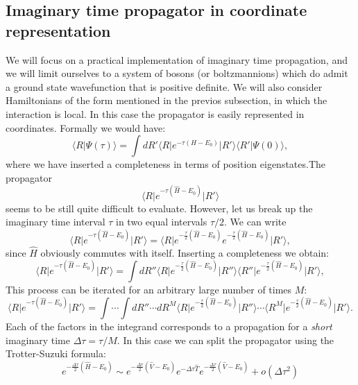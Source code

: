 \subsection{Imaginary time propagator in coordinate representation}
We will focus on a practical implementation of imaginary time propagation, and we will limit ourselves to a system of bosons (or boltzmannions) which do admit a ground state wavefunction that is positive definite. We will also consider Hamiltonians of the form mentioned in the previos subsection, in which the interaction is local.
In this case the propagator is easily represented in coordinates. Formally we would have:
\begin{equation}
\langle R \vert\Psi(\tau)\rangle=\int dR' \langle R\vert e^{-\tau(H-E_0)}\vert R'\rangle\langle R'\vert\Psi(0)\rangle,\label{general_diff}
\end{equation}
where we have inserted a completeness in terms of position eigenstates.The propagator
\begin{equation}
\langle R \vert e^{-\tau(\hat{H}-E_0)}\vert R'\rangle
\end{equation}
seems to be still quite difficult to evaluate. However, let us break up the imaginary time interval
$\tau$ in two equal intervals $\tau/2$. We can write
\begin{equation}
\langle R \vert e^{-\tau(\hat{H}-E_0)}\vert R'\rangle=\langle R \vert e^{-\frac{\tau}{2}(\hat{H}-E_0)}e^{-\frac{\tau}{2}(\hat{H}-E_0)}\vert R'\rangle,
\end{equation}
since $\hat{H}$ obviously commutes with itself. Inserting a completeness we obtain:
 \begin{equation}
\langle R \vert e^{-\tau(\hat{H}-E_0)}\vert R'\rangle=\int dR''\langle R \vert e^{-\frac{\tau}{2}(\hat{H}-E_0)}\vert R''\rangle\langle R''\vert e^{-\frac{\tau}{2}(\hat{H}-E_0)}\vert R'\rangle,
\end{equation}
This process can be iterated for an arbitrary large number of times $M$:
\begin{equation}
\langle R \vert e^{-\tau(\hat{H}-E_0)}\vert R'\rangle=\int\cdots\int dR''\cdots dR^M\langle R \vert e^{-\frac{\tau}{2}(\hat{H}-E_0)}\vert R''\rangle\cdots\langle R^M\vert e^{-\frac{\tau}{2}(\hat{H}-E_0)}\vert R'\rangle.\label{path}
\end{equation}
Each of the factors in the integrand corresponds to a propagation for a {\it short} imaginary time $\Delta\tau=\tau/M$.
In this case we can split the propagator using the Trotter-Suzuki formula:
\begin{equation}
e^{-\frac{\Delta\tau}{2}(\hat{H}-E_0)}\sim e^{-\frac{\Delta\tau}{2}(\hat{V}-E_0)}e^{-\Delta\tau\hat{T}}e^{-\frac{\Delta\tau}{2}(\hat{V}-E_0)}+o(\Delta\tau^2)
\end{equation}
